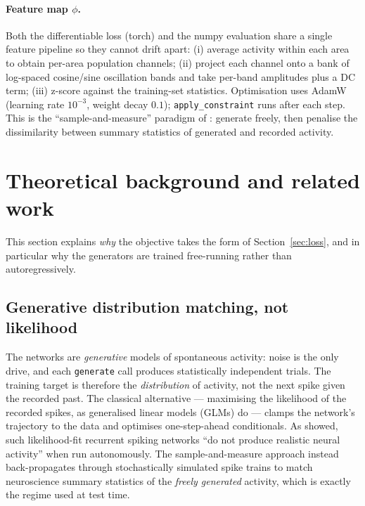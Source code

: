 \documentclass[11pt]{article}
\newcommand{\code}[1]{\texttt{#1}}
\begin{document}
\paragraph{Feature map $\phi$.} Both the differentiable loss (torch) and the
numpy evaluation share a single feature pipeline so they cannot drift apart:
(i) average activity within each area to obtain per-area population channels;
(ii) project each channel onto a bank of log-spaced cosine/sine oscillation
bands and take per-band amplitudes plus a DC term; (iii) z-score against the
training-set statistics. Optimisation uses AdamW (learning rate $10^{-3}$, weight
decay $0.1$); \code{apply\_constraint} runs after each step. This is the
``sample-and-measure'' paradigm of \cite{bellec2021}: generate freely, then
penalise the dissimilarity between summary statistics of generated and recorded
activity.

\section{Theoretical background and related work}
\label{sec:theory}
This section explains \emph{why} the objective takes the form of
Section~\ref{sec:loss}, and in particular why the generators are trained
free-running rather than autoregressively.

\subsection{Generative distribution matching, not likelihood}
The networks are \emph{generative} models of spontaneous activity: noise is the
only drive, and each \code{generate} call produces statistically independent
trials. The training target is therefore the \emph{distribution} of activity, not
the next spike given the recorded past. The classical alternative --- maximising
the likelihood of the recorded spikes, as generalised linear models (GLMs) do ---
clamps the network's trajectory to the data and optimises one-step-ahead
conditionals. As \cite{bellec2021} showed, such likelihood-fit recurrent spiking
networks ``do not produce realistic neural activity'' when run autonomously. The
sample-and-measure approach instead back-propagates through stochastically
simulated spike trains to match neuroscience summary statistics of the
\emph{freely generated} activity, which is exactly the regime used at test time.
\end{document}
